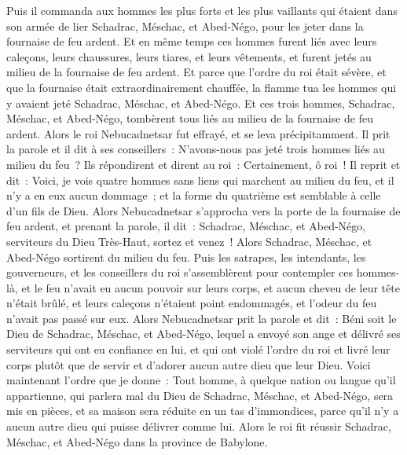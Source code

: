 \begin{multicols}{2}
Puis il commanda aux hommes les plus forts et les plus vaillants qui étaient dans son armée de lier Schadrac, Méschac, et Abed-Négo, pour les jeter dans la fournaise de feu ardent.
Et en même temps ces hommes furent liés avec leurs caleçons, leurs chaussures, leurs tiares, et leurs vêtements, et furent jetés au milieu de la fournaise de feu ardent.
Et parce que l'ordre du roi était sévère, et que la fournaise était extraordinairement chauffée, la flamme tua les hommes qui y avaient jeté Schadrac, Méschac, et Abed-Négo.
Et ces trois hommes, Schadrac, Méschac, et Abed-Négo, tombèrent tous liés au milieu de la fournaise de feu ardent.
Alors le roi Nebucadnetsar fut effrayé, et se leva précipitamment. Il prit la parole et il dit à ses conseillers~: N'avons-nous pas jeté trois hommes liés au milieu du feu~? Ils répondirent et dirent au roi~: Certainement, ô roi~!
Il reprit et dit~: Voici, je vois quatre hommes sans liens qui marchent au milieu du feu, et il n'y a en eux aucun dommage~; et la forme du quatrième est semblable à celle d'un fils de Dieu.
Alors Nebucadnetsar s'approcha vers la porte de la fournaise de feu ardent, et prenant la parole, il dit~: Schadrac, Méschac, et Abed-Négo, serviteurs du Dieu Très-Haut, sortez et venez~! Alors Schadrac, Méschac, et Abed-Négo sortirent du milieu du feu.
Puis les satrapes, les intendants, les gouverneurs, et les conseillers du roi s'assemblèrent pour contempler ces hommes-là, et le feu n'avait eu aucun pouvoir sur leurs corps, et aucun cheveu de leur tête n'était brûlé, et leurs caleçons n'étaient point endommagés, et l'odeur du feu n'avait pas passé sur eux.
Alors Nebucadnetsar prit la parole et dit~: Béni soit le Dieu de Schadrac, Méschac, et Abed-Négo, lequel a envoyé son ange et délivré ses serviteurs qui ont eu confiance en lui, et qui ont violé l'ordre du roi et livré leur corps plutôt que de servir et d'adorer aucun autre dieu que leur Dieu.
Voici maintenant l'ordre que je donne~: Tout homme, à quelque nation ou langue qu'il appartienne, qui parlera mal du Dieu de Schadrac, Méschac, et Abed-Négo, sera mis en pièces, et sa maison sera réduite en un tas d'immondices, parce qu'il n'y a aucun autre dieu qui puisse délivrer comme lui.
Alors le roi fit réussir Schadrac, Méschac, et Abed-Négo dans la province de Babylone.

\end{multicols}
